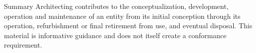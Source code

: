 \documentclass[10pt,letterpaper]{article}
\begin{document}
\begin{CornellSummaryBox}{Summary}
Architecting contributes to the conceptualization, development, operation and maintenance of an entity from its initial conception through its operation, refurbishment or final retirement from use, and eventual disposal. This material is informative guidance and does not itself create a conformance requirement.
\end{CornellSummaryBox}
\end{document}
